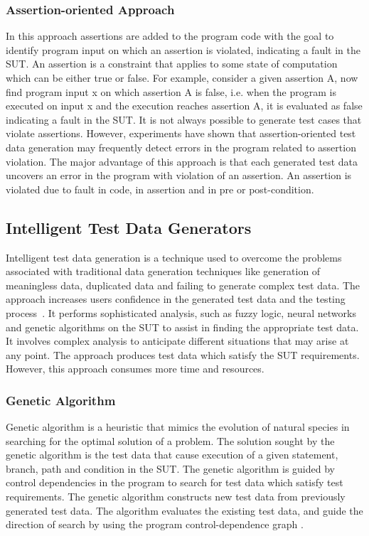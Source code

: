 \subsubsection{Assertion-oriented Approach}
In this approach assertions are added to the program code with the goal to identify program input on which an assertion is violated, indicating a fault in the SUT. An assertion is a constraint that applies to some state of computation which can be either true or false. For example, consider a given assertion A, now find program input x on which assertion A is false, i.e. when the program is executed on input x and the execution reaches assertion A, it is evaluated as false indicating a fault in the SUT. It is not always possible to generate test cases that violate assertions. However, experiments have shown that assertion-oriented test data generation may frequently detect errors in the program related to assertion violation. The major advantage of this approach is that each generated test data uncovers an error in the program with violation of an assertion. An assertion is violated due to fault in code, in assertion and in pre or post-condition.



\subsection{Intelligent Test Data Generators}
\label{sec:intelligent_2}
 Intelligent test data generation is a technique used to overcome the problems associated with traditional data generation techniques like generation of meaningless data, duplicated data and failing to generate complex test data. The approach increases users confidence in the generated test data and the testing process~\cite{ramamoorthy1975testing}. It performs sophisticated analysis, such as fuzzy logic, neural networks and genetic algorithms on the SUT to assist in finding the appropriate test data. It involves complex analysis to anticipate different situations that may arise at any point. The approach produces test data which satisfy the SUT requirements. However, this approach consumes more time and resources.

\subsubsection{Genetic Algorithm}
Genetic algorithm is a heuristic that mimics the evolution of natural species in searching for the optimal solution of a problem. The solution sought by the genetic algorithm is the test data that cause execution of a given statement, branch, path and condition in the SUT. The genetic algorithm is guided by control dependencies in the program to search for test data which satisfy test requirements. The genetic algorithm constructs new test data from previously generated test data. The algorithm evaluates the existing test data, and guide the direction of search by using the program control-dependence graph \cite{pargas1999test}.

